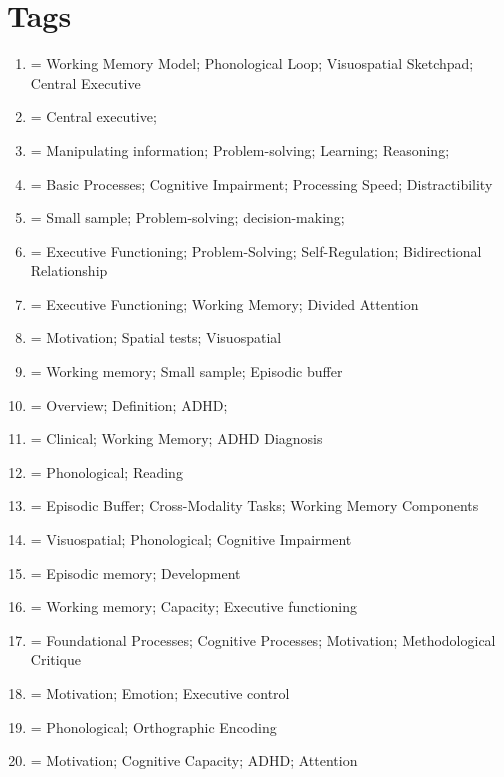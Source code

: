 \documentclass[stu]{apa7}
\begin{document}
\section{Tags}

\begin{enumerate}
    \item \textcite{baddeley_developments_1994} = Working Memory Model; Phonological Loop; Visuospatial Sketchpad; Central Executive
    \item \textcite{baddeley_working_2012} = Central executive;
    \item \textcite{baddeley_working_2020} = Manipulating information; Problem-solving; Learning; Reasoning; 
    \item \textcite{butzbach_basic_2019} = Basic Processes; Cognitive Impairment; Processing Speed; Distractibility
    \item \textcite{capri_attention_2019} = Small sample; Problem-solving; decision-making;
    \item \textcite{drigas_executive_2019} = Executive Functioning; Problem-Solving; Self-Regulation; Bidirectional Relationship
    \item \textcite{elosua_differences_2017} = Executive Functioning; Working Memory; Divided Attention
    \item \textcite{engelmann_motivation_2007} = Motivation; Spatial tests; Visuospatial
    \item \textcite{fabio_working_2020} = Working memory; Small sample; Episodic buffer
    \item \textcite{faraone_attention-deficithyperactivity_2015} = Overview; Definition; ADHD;
    \item \textcite{fried_clinical_2016} = Clinical; Working Memory; ADHD Diagnosis
    \item \textcite{friedman_reading_2017} = Phonological; Reading
    \item \textcite{kofler_are_2018} = Episodic Buffer; Cross-Modality Tasks; Working Memory Components
    \item \textcite{kofler_working_2020} = Visuospatial; Phonological; Cognitive Impairment
    \item \textcite{nyhout_episodic_2023} = Episodic memory; Development
    \item \textcite{mccabe_relationship_2010} = Working memory; Capacity; Executive functioning
    \item \textcite{mohamed_basic_2021} = Foundational Processes; Cognitive Processes; Motivation; Methodological Critique
    \item \textcite{pessoa_how_2009} = Motivation; Emotion; Executive control
    \item \textcite{raiker_phonological_2019} = Phonological; Orthographic Encoding
    \item \textcite{skalski_impact_2021} = Motivation; Cognitive Capacity; ADHD; Attention
\end{enumerate}
\end{document}
